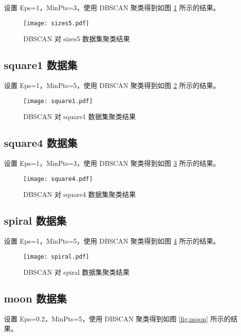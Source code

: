 \documentclass[12pt,AutoFakeBold]{article}
\begin{document}
设置 Eps=1，MinPts=3，使用 DBSCAN 聚类得到如图 \ref{fig:sizes5} 所示的结果。

\begin{figure}[H]
	\centering
    \texttt{[image: sizes5.pdf]}
    \caption{DBSCAN 对 sizes5 数据集聚类结果} \label{fig:sizes5}
\end{figure}

\subsection{square1 数据集}

设置 Eps=1，MinPts=5，使用 DBSCAN 聚类得到如图 \ref{fig:square1} 所示的结果。

\begin{figure}[H]
	\centering
    \texttt{[image: square1.pdf]}
    \caption{DBSCAN 对 square1 数据集聚类结果} \label{fig:square1}
\end{figure}

\subsection{square4 数据集}

设置 Eps=1，MinPts=3，使用 DBSCAN 聚类得到如图 \ref{fig:square4} 所示的结果。

\begin{figure}[H]
	\centering
    \texttt{[image: square4.pdf]}
    \caption{DBSCAN 对 square4 数据集聚类结果} \label{fig:square4}
\end{figure}

\subsection{spiral 数据集}

设置 Eps=1，MinPts=5，使用 DBSCAN 聚类得到如图 \ref{fig:spiral} 所示的结果。

\begin{figure}[H]
	\centering
    \texttt{[image: spiral.pdf]}
    \caption{DBSCAN 对 spiral 数据集聚类结果} \label{fig:spiral}
\end{figure}

\subsection{moon 数据集}

设置 Eps=0.2，MinPts=5，使用 DBSCAN 聚类得到如图 \ref{fig:moon} 所示的结果。
\end{document}
